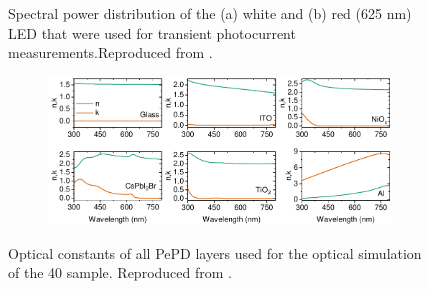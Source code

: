 \begin{figure}[ht!]
    \caption[Spectral power distribution of the white and red (625 nm) LED that were used for transient photocurrent measurements.]{Spectral power distribution of the (a) white and (b) red (625 nm) LED that were used for transient photocurrent measurements.Reproduced from \cite{Papadopoulou2025ElectronSpeed}.}
    \label{fig:etl_opt:tpc_sources}
\end{figure}



\begin{figure}[htbp]
    \centering
    \begin{subfigure}[t]{0.99\textwidth}
        \centering
        \includegraphics[width=\textwidth]{chapters/transport_layers/images/nk_transfer_matrix.pdf} %
                
    \end{subfigure}
    \caption[Optical constants of all PePD layers used for the optical simulation of the 40 sample.]{Optical constants of all PePD layers used for the optical simulation of the 40 sample. Reproduced from \cite{Papadopoulou2025ElectronSpeed}.}
    \label{fig:tetl_opt:nk_transfer_materix}
\end{figure}

